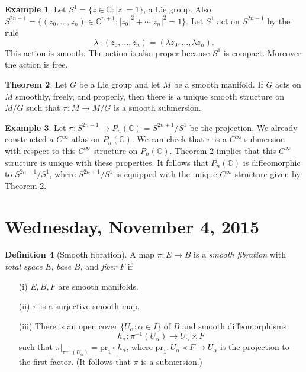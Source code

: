 \documentclass{amsart}
\numberwithin{equation}{section}
\newcommand{\bC}{\mathbb{C}}
\theoremstyle{definition}
\newtheorem{definition}{Definition} [section]
\newtheorem{example}[definition]{Example}
\theoremstyle{theorem}
\newtheorem{theorem}[definition]{Theorem}
\begin{document}
\begin{example}
Let $S^1 = \{z \in \mathbb{C} : |z| = 1\}$, a Lie group. Also $S^{2n+1} = \{(z_0, \ldots, z_n) \in \mathbb{C}^{n+1} : |z_0|^2 + \cdots |z_n|^2 = 1\}$. Let $S^1$ act on $S^{2n+1}$ by the rule 
\[
\lambda \cdot(z_0, \ldots, z_n)  = (\lambda z_0, \ldots, \lambda z_n).
\]
This action is smooth. The action is also proper because $S^1$ is compact. Moreover the action is free. 
\end{example}

\begin{theorem}\label{thm:MG}
Let $G$ be a Lie group and let $M$ be a smooth manifold. If $G$ acts on $M$ smoothly, freely, and properly, then there is a unique smooth structure on $M/G$ such that $\pi : M \to M/G$ is a smooth submersion. 
\end{theorem}

\begin{example}
Let $\pi : S^{2n+1} \to P_n(\bC) = S^{2n+1}/S^1$ be the projection. We already constructed a $C^\infty$ atlas on $P_n(\bC)$. We can check that $\pi$ is a $C^\infty$ submersion with respect to 
this $C^\infty$ structure on $P_n(\bC)$. Theorem \ref{thm:MG} implies that this $C^\infty$  structure is unique with these properties. It follows that $P_n(\bC)$ is diffeomorphic to $S^{2n+1}/S^1$, 
where $S^{2n+1}/S^1$ is equipped with the unique $C^\infty$ structure given by 
Theorem \ref{thm:MG}.
\end{example}

\section{Wednesday, November 4, 2015}



\begin{definition}[Smooth fibration]
A map $\pi : E \to B$ is a {\em smooth fibration} with {\em total space} $E$, {\em base} $B$, and 
{\em fiber} $F$ if 
\begin{enumerate}
\item[(i)] $E,B,F$ are smooth manifolds. 
\item[(ii)] $\pi$ is a surjective smooth map. 
\item[(iii)] There is an open cover $\{U_\alpha:\alpha\in I\}$ of $B$ and smooth diffeomorphisms
\[
h_\alpha : \pi^{-1}(U_\alpha) \to U_\alpha \times F
\]
such that $\pi|_{\pi^{-1}(U_\alpha)} = \text{pr}_1 \circ h_\alpha$, where
$\mathrm{pr}_1:U_\alpha\times F\to U_\alpha$ is the projection to the first factor.
(It follows that $\pi$ is a submersion.)

\end{enumerate}
\end{definition}
\end{document}
